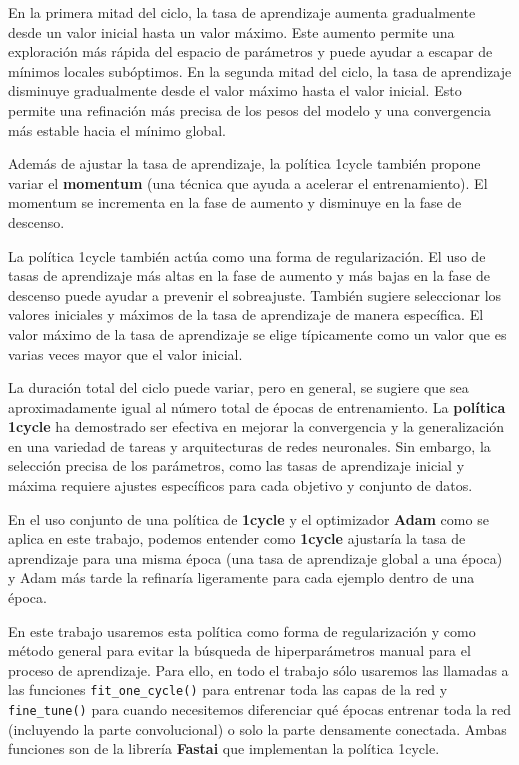 En la primera mitad del ciclo, la tasa de aprendizaje aumenta gradualmente desde un valor inicial hasta un valor máximo. Este aumento permite una exploración más rápida del espacio de parámetros y puede ayudar a escapar de mínimos locales subóptimos. En la segunda mitad del ciclo, la tasa de aprendizaje disminuye gradualmente desde el valor máximo hasta el valor inicial. Esto permite una refinación más precisa de los pesos del modelo y una convergencia más estable hacia el mínimo global.

Además de ajustar la tasa de aprendizaje, la política 1cycle también propone variar el \textbf{momentum} (una técnica que ayuda a acelerar el entrenamiento). El momentum se incrementa en la fase de aumento y disminuye en la fase de descenso.

La política 1cycle también actúa como una forma de regularización. El uso de tasas de aprendizaje más altas en la fase de aumento y más bajas en la fase de descenso puede ayudar a prevenir el sobreajuste. También sugiere seleccionar los valores iniciales y máximos de la tasa de aprendizaje de manera específica. El valor máximo de la tasa de aprendizaje se elige típicamente como un valor que es varias veces mayor que el valor inicial. 

La duración total del ciclo puede variar, pero en general, se sugiere que sea aproximadamente igual al número total de épocas de entrenamiento.
La \textbf{política 1cycle} ha demostrado ser efectiva en mejorar la convergencia y la generalización en una variedad de tareas y arquitecturas de redes neuronales. Sin embargo, la selección precisa de los parámetros, como las tasas de aprendizaje inicial y máxima requiere ajustes específicos para cada objetivo y conjunto de datos.

En el uso conjunto de una política de \textbf{1cycle} y el optimizador \textbf{Adam} como se aplica en este trabajo, podemos entender como \textbf{1cycle} ajustaría la tasa de aprendizaje para una misma época (una tasa de aprendizaje global a una época) y Adam más tarde la refinaría ligeramente para cada ejemplo dentro de una época.  

En este trabajo usaremos esta política como forma de regularización y como método general para evitar la búsqueda de hiperparámetros manual para el proceso de aprendizaje. Para ello, en todo el trabajo sólo usaremos las llamadas a las funciones \texttt{fit\_one\_cycle()} para entrenar toda las capas de la red y \texttt{fine\_tune()} para cuando necesitemos diferenciar qué épocas entrenar toda la red (incluyendo la parte convolucional) o solo la parte densamente conectada. Ambas funciones son de la librería \textbf{Fastai} que implementan la política 1cycle. 


